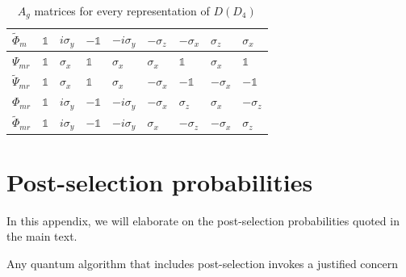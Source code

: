 \documentclass[two column]{article}
\newcommand{\caro}[1]{\textcolor{red}{[#1]}}
\newcommand{\jovan}[1]{\textcolor{blue}{[#1]}}
\begin{document}
\begin{table}[]
\begin{tabular}{|l||l|l|l|l|l|l|l|l|}
 $\tilde{\Phi}_{m}$ &$\mathbb{1}$&$i\sigma_y$ &$-\mathbb{1}$& $-i\sigma_y$ &$-\sigma_z$ &$-\sigma_x$ &  $\sigma_z$ &   $\sigma_x$ \\\hline
$\Psi_{mr}$ &$\mathbb{1}$&  $\sigma_x$ & $\mathbb{1}$&  $\sigma_x$ & $\sigma_x$ & $\mathbb{1}$&  $\sigma_x$ &   $\mathbb{1}$\\\hline
$\tilde{\Psi}_{mr}$ &$\mathbb{1}$&  $\sigma_x$ & $\mathbb{1}$&  $\sigma_x$ &$-\sigma_x$ &$-\mathbb{1}$& $-\sigma_x$ &  $-\mathbb{1}$\\\hline
$\Phi_{mr}$ &$\mathbb{1}$&$i\sigma_y$ &$-\mathbb{1}$& $-i\sigma_y$ &$-\sigma_x$ & $\sigma_z$ &  $\sigma_x$ &  $-\sigma_z$ \\\hline
$\tilde{\Phi}_{mr}$ &$\mathbb{1}$&$i\sigma_y$ &$-\mathbb{1}$& $-i\sigma_y$ & $\sigma_x$ &$-\sigma_z$ & $-\sigma_x$ &   $\sigma_z$ \\\hline
\end{tabular}
    \caption{$A_g$ matrices for every representation of $D(D_4)$}
    \label{tab:reps}
\end{table}






\section{Post-selection probabilities}\label{app:postsel}
In this appendix, we will elaborate on the post-selection probabilities quoted in the main text.

Any quantum algorithm that includes post-selection invokes a justified concern  
\end{document}
